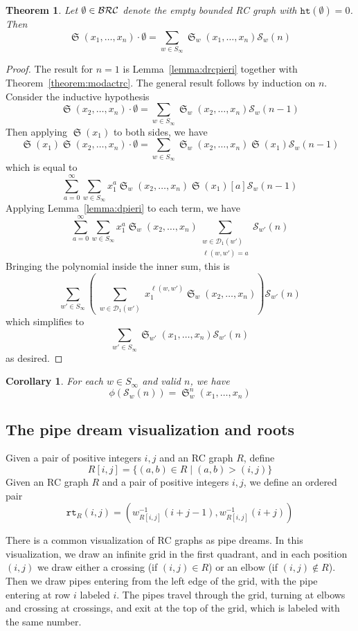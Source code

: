 \documentclass{amsart}
\newtheorem{corollary}[lemma]{Corollary}
\newtheorem{theorem}{Theorem}[section]
\theoremstyle{definition}
\theoremstyle{remark}
\numberwithin{equation}{subsection}
\DeclareMathOperator{\sch}{\mathfrak{S}}
\newcommand{\wof}[1]{w_{#1}}
\newcommand{\rtt}{\mathtt{rt}}
\newcommand{\hr}{\mathtt{ht}}
\newcommand{\dcoma}{\mathcal{D}}
\begin{document}
\begin{theorem}
	Let $\emptyset\in \mathcal{BRC}$ denote the empty bounded RC graph with $\hr(\emptyset)=0$. Then
	$$\sch(x_1,\ldots,x_n)\cdot \emptyset=\sum_{w\in S_\infty}\sch_w(x_1,\ldots,x_n)\mathcal{S}_w(n)$$
\end{theorem}
\begin{proof}
	The result for $n=1$ is Lemma~\ref{lemma:drcpieri} together with Theorem~\ref{theorem:modactrc}. The general result follows by induction on $n$. Consider the inductive hypothesis
	$$\sch(x_2,\ldots,x_n)\cdot \emptyset=\sum_{w\in S_\infty}\sch_w(x_2,\ldots,x_n)\mathcal{S}_w(n-1)$$
	Then applying $\sch(x_1)$ to both sides, we have
	$$\sch(x_1)\sch(x_2,\ldots,x_n)\cdot \emptyset=\sum_{w\in S_\infty}\sch_w(x_2,\ldots,x_n)\sch(x_1)\mathcal{S}_w(n-1)$$
	which is equal to
	$$\sum_{a=0}^\infty\sum_{w\in S_\infty}x_1^a\sch_w(x_2,\ldots,x_n)\sch(x_1)[a]\mathcal{S}_w(n-1)$$
	Applying Lemma~\ref{lemma:dpieri} to each term, we have
	$$\sum_{a=0}^\infty\sum_{w\in S_\infty}x_1^a\sch_w(x_2,\ldots,x_n)\sum_{\substack{w\in \mathcal{D}_1(w')\\\ell(w,w')=a}} \mathcal{S}_{w'}(n)$$
	Bringing the polynomial inside the inner sum, this is
	$$\sum_{w'\in S_\infty}\left(\sum_{\substack{w\in \mathcal{D}_1(w')}} x_1^{\ell(w,w')}\sch_w(x_2,\ldots,x_n)\right)\mathcal{S}_{w'}(n)$$
	which simplifies to
	$$\sum_{w'\in S_\infty}\sch_{w'}(x_1,\ldots,x_n)\mathcal{S}_{w'}(n)$$
	as desired.
\end{proof}

\begin{corollary}
	For each $w\in S_\infty$ and valid $n$, we have
	$$\phi(\mathcal{S}_w(n)) = \sch_w^n(x_1,\ldots,x_n)$$
\end{corollary}

\subsection{The pipe dream visualization and roots}

Given a pair of positive integers $i,j$ and an RC graph $R$, define 
$$R[i, j]=\{(a, b)\in R\mid (a, b) > (i, j)\}$$
Given an RC graph $R$ and a pair of positive integers $i, j$, we define an ordered pair
$$\rtt_R(i,j)=(\wof{R[i, j]}^{-1}(i + j - 1), \wof{R[i,j]}^{-1}(i+j))$$

There is a common visualization of RC graphs as pipe dreams. In this visualization, we draw an infinite grid in the first quadrant, and in each position $(i,j)$ we draw either a crossing (if $(i,j)\in R$) or an elbow (if $(i,j)\notin R$). Then we draw pipes entering from the left edge of the grid, with the pipe entering at row $i$ labeled $i$. The pipes travel through the grid, turning at elbows and crossing at crossings, and exit at the top of the grid, which is labeled with the same number.
\end{document}
